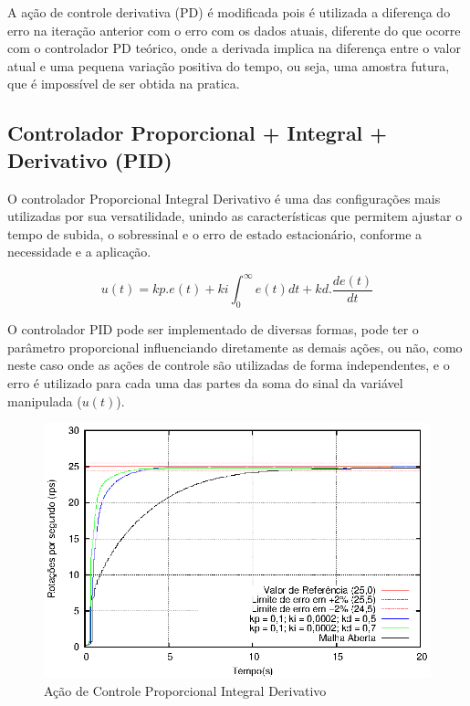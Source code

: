 A ação de controle derivativa (PD) é modificada pois é utilizada a diferença do erro na iteração anterior com o erro com os dados atuais, diferente do que ocorre com o controlador PD teórico, onde a derivada implica na diferença entre o valor atual e uma pequena variação positiva do tempo, ou seja, uma amostra futura, que é impossível de ser obtida na pratica. 










\subsection{ Controlador Proporcional + Integral + Derivativo (PID) }

O controlador Proporcional Integral Derivativo é uma das configurações mais utilizadas por sua versatilidade, unindo as características que permitem ajustar o tempo de subida, o sobressinal e o erro de estado estacionário, conforme a necessidade e a aplicação.

\begin{equation}
u(t) = kp.e(t) + ki \int_{0}^{\infty} e(t) dt + kd. \frac{d e(t)}{dt}
\end{equation}

O controlador PID pode ser implementado de diversas formas, pode ter o parâmetro proporcional influenciando diretamente as demais ações, ou não, como neste caso onde as ações de controle são utilizadas de forma independentes, e o erro é utilizado para cada uma das partes da soma do sinal da variável manipulada ($u(t)$).

\begin{figure}[!htb]
\center\includegraphics[scale=1.4]{./imagens/acaoPID.eps}
\caption{Ação de Controle Proporcional Integral Derivativo}
\label{fig:acaoPID}
\end{figure}

